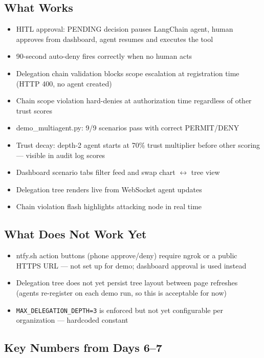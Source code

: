 \documentclass[12pt, a4paper]{article}
\begin{document}
\subsection{What Works}

\begin{itemize}[noitemsep]
  \item HITL approval: PENDING decision pauses LangChain agent, human approves
    from dashboard, agent resumes and executes the tool
  \item 90-second auto-deny fires correctly when no human acts
  \item Delegation chain validation blocks scope escalation at registration time
    (HTTP 400, no agent created)
  \item Chain scope violation hard-denies at authorization time regardless of
    other trust scores
  \item demo\_multiagent.py: 9/9 scenarios pass with correct PERMIT/DENY
  \item Trust decay: depth-2 agent starts at 70\% trust multiplier before
    other scoring — visible in audit log scores
  \item Dashboard scenario tabs filter feed and swap chart $\leftrightarrow$ tree view
  \item Delegation tree renders live from WebSocket agent updates
  \item Chain violation flash highlights attacking node in real time
\end{itemize}

\subsection{What Does Not Work Yet}

\begin{itemize}[noitemsep]
  \item ntfy.sh action buttons (phone approve/deny) require ngrok or a public
    HTTPS URL — not set up for demo; dashboard approval is used instead
  \item Delegation tree does not yet persist tree layout between page refreshes
    (agents re-register on each demo run, so this is acceptable for now)
  \item \texttt{MAX\_DELEGATION\_DEPTH=3} is enforced but not yet configurable
    per organization — hardcoded constant
\end{itemize}

\subsection{Key Numbers from Days 6--7}
\end{document}
